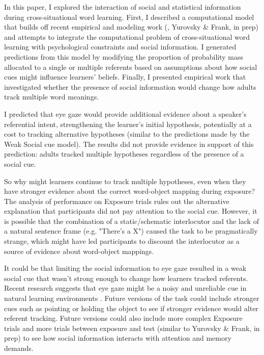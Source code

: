 \documentclass[10pt,letterpaper]{article}
\begin{document}
In this paper, I explored the interaction of social and statistical information during cross-situational word learning. First, I described a computational model that builds off recent empirical and modeling work (, Yurovsky & Frank, in prep) and attempts to integrate the computational problem of cross-situational word learning with psychological constraints and social information. I generated predictions from this model by modifying the proportion of probability mass allocated to a single or multiple referents based on assumptions about how social cues might influence learners' beliefs. Finally, I presented empirical work that investigated whether the presence of social information would change how adults track multiple word meanings. 

I predicted that eye gaze would provide additional evidence about a speaker's referential intent, strengthening the learner's initial hypothesis, potentially at a cost to tracking alternative hypotheses (similar to the predictions made by the Weak Social cue model). The results did not provide evidence in support of this prediction: adults tracked multiple hypotheses regardless of the presence of a social cue. 

So why might learners continue to track multiple hypotheses, even when they have stronger evidence about the correct word-object mapping during exposure? The analysis of performance on Exposure trials rules out the alternative explanation that participants did not pay attention to the social cue. However, it is possible that the combination of a static/schematic interlocutor and the lack of a natural sentence frame (e.g. "There's a X") caused the task to be pragmatically strange, which might have led participants to discount the interlocutor as a source of evidence about word-object mappings. 

It could be that limiting the social information to eye gaze resulted in a weak social cue that wasn't strong enough to change how learners tracked referents. Recent research suggests that eye gaze might be a noisy and unreliable cue in natural learning environments \cite{frank2013social}. Future versions of the task could include stronger cues such as pointing or holding the object to see if stronger evidence would alter referent tracking. Future versions could also include more complex Exposure trials and more trials between exposure and test (similar to Yurovsky & Frank, in prep) to see how social information interacts with attention and memory demands. 
\end{document}
